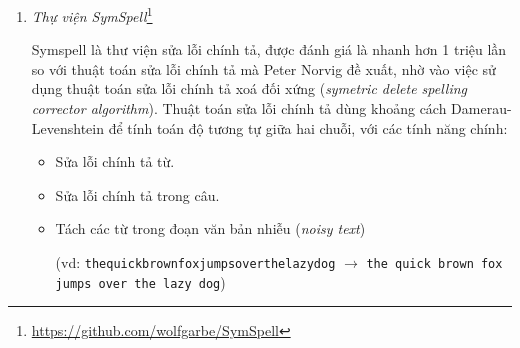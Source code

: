 \begin{enumerate}
    \item \textit{Thự viện SymSpell}\footnote{\url{https://github.com/wolfgarbe/SymSpell}}

          Symspell là thư viện sửa lỗi chính tả, được đánh giá là nhanh hơn 1 triệu lần so với thuật toán sửa lỗi chính tả mà Peter Norvig đề xuất, nhờ vào việc sử dụng thuật toán sửa lỗi chính tả xoá đối xứng (\textit{symetric delete spelling corrector algorithm}). Thuật toán sửa lỗi chính tả dùng khoảng cách Damerau-Levenshtein để tính toán độ tương tự giữa hai chuỗi, với các tính năng chính:
          \begin{itemize}
              \item Sửa lỗi chính tả từ.
              \item Sửa lỗi chính tả trong câu.
              \item Tách các từ trong đoạn văn bản nhiễu (\textit{noisy text})

                    {\raggedright(vd: \texttt{thequickbrownfoxjumpsoverthelazydog} $\to$ \texttt{the quick brown fox jumps over the lazy dog})\par}
          \end{itemize}
\end{enumerate}


